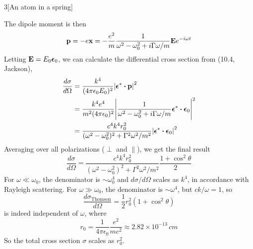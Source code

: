 \documentclass[12pt]{article}
\begin{document}
\begin{problem}{3}[An atom in a spring]
\begin{solution}
\begin{equation}
\end{equation}
The dipole moment is then
\begin{equation}
    \vb{p}=-e\vb{x}
    =-\frac{e^2}{m}\frac1{\omega^2-\omega_0^2+i\Gamma\omega/m}\vb{E}
    e^{-i\omega t}
\end{equation}
Letting $\vb{E}=E_0\bm\epsilon_0$, we can calculate the differential cross
section from (10.4, Jackson),
\begin{align}
    \frac{d\sigma}{d\Omega}
    &=\frac{k^4}{(4\pi\epsilon_0E_0)^2}\abs{\bm\epsilon^\ast\vdot\vb{p}}^2\notag\\
    &=\frac{k^4e^4}{m^2(4\pi\epsilon_0)^2}\abs{\frac1{\omega^2-\omega_0^2+i\Gamma\omega/m}\bm\epsilon^\ast\vdot\bm\epsilon_0}^2\notag\\
    &=\frac{c^4k^4r_0^2}{(\omega^2-\omega_0^2)^2+\Gamma^2\omega^2/m^2}\abs{\bm\epsilon^\ast\vdot\bm\epsilon_0}^2
\end{align}
Averaging over all polarizations ($\perp$ and $\parallel$), we get the final 
result
\begin{equation}
    \frac{d\sigma}{d\Omega}=\frac{c^4k^4r_0^2}{(\omega^2-\omega_0^2)^2+\Gamma^2\omega^2/m^2}\frac{1+\cos^2\theta}{2} 
\end{equation}
For $\omega\ll\omega_0$, the denominator is $\sim\omega_0^4$ and
$d\sigma/d\Omega$ scales as $k^4$, in accordance with Rayleigh scattering. For
$\omega\gg\omega_0$, the denominator is $\sim\omega^4$, but $ck/\omega=1$, so
\begin{equation}
    \frac{d\sigma_\text{Thomson}}{d\Omega}=\frac12r_0^2(1+\cos^2\theta)
\end{equation}
is indeed independent of $\omega$, where
\begin{equation}
    r_0=\frac1{4\pi\epsilon_0}\frac{e^2}{mc^2} 
    \approx2.82\times10^{-13}\,\unit{cm}
\end{equation}
So the total cross section $\sigma$ scales as $r_0^2$.
\end{solution}
\end{problem}
\end{document}
